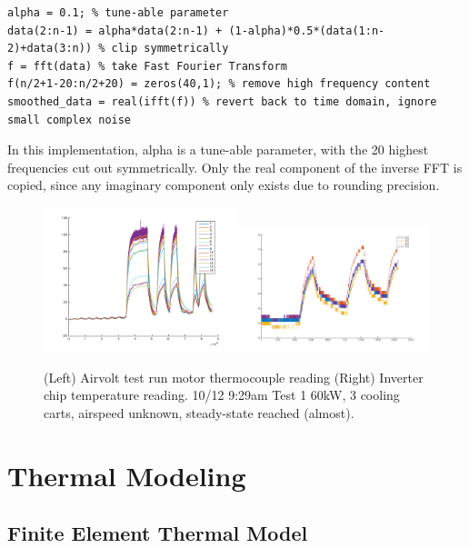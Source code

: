 \documentclass[]{aiaa-tc}%
\begin{document}
\begin{verbatim}
alpha = 0.1; % tune-able parameter 
data(2:n-1) = alpha*data(2:n-1) + (1-alpha)*0.5*(data(1:n-2)+data(3:n)) % clip symmetrically
f = fft(data) % take Fast Fourier Transform
f(n/2+1-20:n/2+20) = zeros(40,1); % remove high frequency content
smoothed_data = real(ifft(f)) % revert back to time domain, ignore small complex noise
\end{verbatim}

In this implementation, alpha is a tune-able parameter, with the 20 highest frequencies cut out symmetrically. Only the real component of the inverse FFT is copied, since any imaginary component only exists due to rounding precision.

\begin{figure}[!htb]%
	\centering
	\includegraphics[width=0.5\textwidth]{figures/AirvoltMotor.png}\includegraphics[width=0.5\textwidth]{figures/AirvoltCMC.png}
	\caption{(Left) Airvolt test run motor thermocouple reading (Right) Inverter chip temperature reading.
    10/12 9:29am Test 1 60kW, 3 cooling carts, airspeed unknown, steady-state reached (almost).}
	\label{fig:airvoltData}
\end{figure}

\section{Thermal Modeling}

\subsection{Finite Element Thermal Model}
\end{document}
